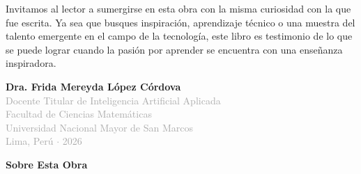 \documentclass[12pt, a4paper]{article}
\begin{document}
Invitamos al lector a sumergirse en esta obra con la misma curiosidad con la que fue escrita. Ya sea que busques inspiración, aprendizaje técnico o una muestra del talento emergente en el campo de la tecnología, este libro es testimonio de lo que se puede lograr cuando la pasión por aprender se encuentra con una enseñanza inspiradora.

\vfill

\begin{flushright}
    \textbf{Dra. Frida Mereyda López Córdova}\\
    \textcolor{darkgray}{Docente Titular de Inteligencia Artificial Aplicada}\\
    \textcolor{darkgray}{Facultad de Ciencias Matemáticas}\\
    \textcolor{darkgray}{Universidad Nacional Mayor de San Marcos}\\
    \textcolor{darkgray}{Lima, Perú $\cdot$ 2026}
\end{flushright}
\vspace*{0.3cm}


\clearpage


\clearpage


\clearpage


\clearpage


\clearpage


\clearpage


\clearpage
\setcounter{section}{7} %


\clearpage


\clearpage


\clearpage


\clearpage


\clearpage


\clearpage


\newpage
{} 
{}
\vspace*{0.5cm}
{\Huge \textbf{Sobre Esta Obra}}\\[0.8cm]
\end{document}
